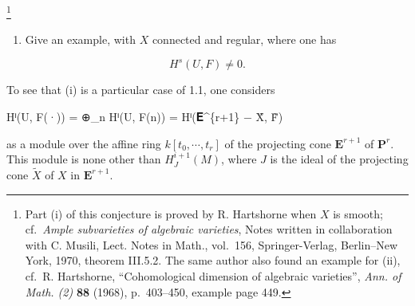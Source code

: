 \documentclass[
]{article}
\newenvironment{Shaded}{}{}
\newcommand{\NormalTok}[1]{#1}
\providecommand{\tightlist}{%
  \setlength{\itemsep}{0pt}\setlength{\parskip}{0pt}}
\begin{document}
\footnote{Part (i) of this conjecture is proved by R. Hartshorne when
  \(X\) is smooth; cf.~\emph{Ample subvarieties of algebraic varieties},
  Notes written in collaboration with C. Musili, Lect. Notes in Math.,
  vol.~156, Springer-Verlag, Berlin--New York, 1970, theorem III.5.2.
  The same author also found an example for (ii), cf.~R. Hartshorne,
  ``Cohomological dimension of algebraic varieties'', \emph{Ann. of
  Math. (2)} \textbf{88} (1968), p.~403--450, example page 449.}

\begin{enumerate}
\def\labelenumi{(\roman{enumi})}
\setcounter{enumi}{1}
\tightlist
\item
  Give an example, with \(X\) connected and regular, where one has
\end{enumerate}

\[
H^{s}(U, F) \neq 0.
\]

To see that (i) is a particular case of 1.1, one considers

\begin{Shaded}
\begin{Highlighting}[]
\NormalTok{Hⁱ(U, F(·)) = ⊕\_n Hⁱ(U, F(n)) = Hⁱ(𝐄\^{}\{r+1\} − X̃, F̃)}
\end{Highlighting}
\end{Shaded}

as a module over the affine ring \(k[t_{0}, \cdots, t_{r}]\) of the
projecting cone \(\mathbf{E}^{r+1}\) of \(\mathbf{P}^{r}\). This module
is none other than \(H^{i+1}_{J}(M)\), where \(J\) is the ideal of the
projecting cone \(\tilde{X}\) of \(X\) in \(\mathbf{E}^{r+1}\).
\end{document}

